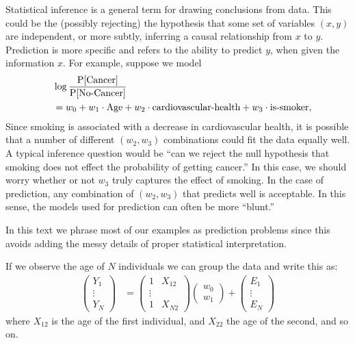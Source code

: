 \begin{digression*}
  Statistical inference is a general term for drawing conclusions from data.  This could be the (possibly rejecting) the hypothesis that some set of variables $(x,y)$ are independent, or more subtly, inferring a causal relationship from $x$ to $y$.  Prediction is more specific and refers to the ability to predict $y$, when given the information $x$.  
For example, suppose we model 
  \begin{align*}
    &\log\frac{\mathrm{P}[\mbox{Cancer}]}{\mathrm{P}[\mbox{No-Cancer}]} \\
    \quad &= w_0 + w_1\cdot \mbox{Age} + w_2\cdot\mbox{cardiovascular-health} + w_3\cdot \mbox{is-smoker},
  \end{align*}
Since smoking is associated with a decrease in cardiovascular health, it is possible that a number of different $(w_2, w_3)$ combinations could fit the data equally well.  A typical inference question would be ``can we reject the null hypothesis that smoking does not effect the probability of getting cancer.''  In this case, we should worry whether or not $w_3$ truly captures the effect of smoking.  In the case of prediction, any combination of $(w_2, w_3)$ that predicts well is acceptable.  In this sense, the models used for prediction can often be more ``blunt.''  

In this text we phrase most of our examples as prediction problems since this avoids adding the messy details of proper statistical interpretation.
\end{digression*}

If we observe the age of $N$ individuals we can group the data and write this as:
\begin{align*}
  \left( 
  \begin{matrix}
    Y_1\\\vdots\\Y_N
  \end{matrix}
  \right) &= \left( 
  \begin{matrix}
    1 & X_{12}\\
    \vdots & \\
    1 & X_{N2}
  \end{matrix}
  \right) \left( 
  \begin{matrix}
    w_0\\w_1
  \end{matrix}
  \right) 
  + \left( 
  \begin{matrix}
    E_1\\\vdots\\E_N
  \end{matrix}
  \right)
\end{align*}
where $X_{12}$ is the age of the first individual, and $X_{22}$ the age of the second, and so on.

